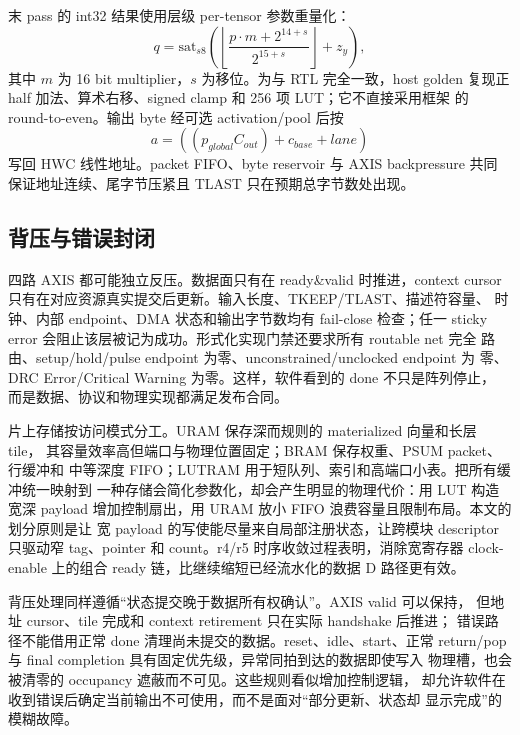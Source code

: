 末 pass 的 int32 结果使用层级 per-tensor 参数重量化：
\begin{equation}
q=\mathrm{sat}_{s8}\left(\left\lfloor
\frac{p\cdot m+2^{14+s}}{2^{15+s}}\right\rfloor+z_y\right),
\end{equation}
其中 $m$ 为 16 bit multiplier，$s$ 为移位。为与 RTL 完全一致，host golden
复现正 half 加法、算术右移、signed clamp 和 256 项 LUT；它不直接采用框架
的 round-to-even。输出 byte 经可选 activation/pool 后按
\begin{equation}
a=((p_{global}C_{out})+c_{base}+lane)
\end{equation}
写回 HWC 线性地址。packet FIFO、byte reservoir 与 AXIS backpressure 共同
保证地址连续、尾字节压紧且 TLAST 只在预期总字节数处出现。

\subsection{背压与错误封闭}

四路 AXIS 都可能独立反压。数据面只有在 ready\&valid 时推进，context
cursor 只有在对应资源真实提交后更新。输入长度、TKEEP/TLAST、描述符容量、
时钟、内部 endpoint、DMA 状态和输出字节数均有 fail-close 检查；任一 sticky
error 会阻止该层被记为成功。形式化实现门禁还要求所有 routable net 完全
路由、setup/hold/pulse endpoint 为零、unconstrained/unclocked endpoint 为
零、DRC Error/Critical Warning 为零。这样，软件看到的 done 不只是阵列停止，
而是数据、协议和物理实现都满足发布合同。

片上存储按访问模式分工。URAM 保存深而规则的 materialized 向量和长层 tile，
其容量效率高但端口与物理位置固定；BRAM 保存权重、PSUM packet、行缓冲和
中等深度 FIFO；LUTRAM 用于短队列、索引和高端口小表。把所有缓冲统一映射到
一种存储会简化参数化，却会产生明显的物理代价：用 LUT 构造宽深 payload
增加控制扇出，用 URAM 放小 FIFO 浪费容量且限制布局。本文的划分原则是让
宽 payload 的写使能尽量来自局部注册状态，让跨模块 descriptor 只驱动窄
tag、pointer 和 count。r4/r5 时序收敛过程表明，消除宽寄存器 clock-enable
上的组合 ready 链，比继续缩短已经流水化的数据 D 路径更有效。

背压处理同样遵循“状态提交晚于数据所有权确认”。AXIS valid 可以保持，
但地址 cursor、tile 完成和 context retirement 只在实际 handshake 后推进；
错误路径不能借用正常 done 清理尚未提交的数据。reset、idle、start、正常
return/pop 与 final completion 具有固定优先级，异常同拍到达的数据即使写入
物理槽，也会被清零的 occupancy 遮蔽而不可见。这些规则看似增加控制逻辑，
却允许软件在收到错误后确定当前输出不可使用，而不是面对“部分更新、状态却
显示完成”的模糊故障。
